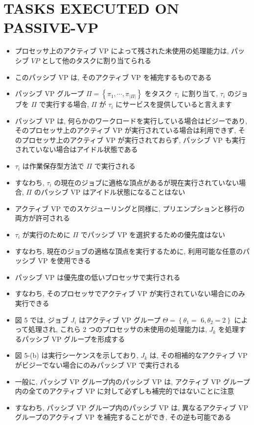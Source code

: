 
\section{TASKS EXECUTED ON PASSIVE-VP}
\label{sec: tasks executed on passive-vp}

\begin{frame}{}
    \begin{itemize}
        \item プロセッサ上のアクティブ VP によって残された未使用の処理能力は, パッシブ $V P$ として他のタスクに割り当てられる
\item このパッシブ VP は, そのアクティブ VP を補完するものである
\item パッシブ VP グループ $\Pi=\left\{\pi_{1}, \cdots, \pi_{|\Pi|}\right\}$ をタスク $\tau_{i}$ に割り当て, $\tau_{i}$ のジョブを $\Pi$ で実行する場合, $\Pi$ が $\tau_{i}$ にサービスを提供していると言えます
\item パッシブ VP は, 何らかのワークロードを実行している場合はビジーであり, そのプロセッサ上のアクティブ VP が実行されている場合は利用できず, そのプロセッサ上のアクティブ VP が実行されておらず, パッシブ VP も実行されていない場合はアイドル状態である
\item $\tau_{i}$ は作業保存型方法で $\Pi$ で実行される
\item すなわち, $\tau_{i}$ の現在のジョブに適格な頂点があるが現在実行されていない場合, $\Pi$ のパッシブ VP はアイドル状態になることはない
\item アクティブ VP でのスケジューリングと同様に, プリエンプションと移行の両方が許可される
\item $\tau_{i}$ が実行のために $\Pi$ でパッシブ VP を選択するための優先度はない
\item すなわち, 現在のジョブの適格な頂点を実行するために, 利用可能な任意のパッシブ VP を使用できる
\item パッシブ VP は優先度の低いプロセッサで実行される
\item すなわち, そのプロセッサでアクティブ VP が実行されていない場合にのみ実行できる
    \end{itemize}
\end{frame}

\begin{frame}{}
    \begin{itemize}
        \item 図 5 では, ジョブ $J_{i}$ はアクティブ VP グループ $\Theta=\left\{\theta_{1}=\right.$  $\left.6, \theta_{2}=2\right\}$ によって処理され, これら 2 つのプロセッサの未使用の処理能力は, $J_{k}$ を処理するパッシブ VP グループを形成する
\item 図 5-(b) は実行シーケンスを示しており, $J_{k}$ は, その相補的なアクティブ VP がビジーでない場合にのみパッシブ VP で実行される
\item 一般に, パッシブ VP グループ内のパッシブ VP は, アクティブ VP グループ内の全てのアクティブ VP に対して必ずしも補完的ではないことに注意
\item すなわち, パッシブ VP グループ内のパッシブ VP は, 異なるアクティブ VP グループのアクティブ VP を補完することができ, その逆も可能である
    \end{itemize}
\end{frame}

